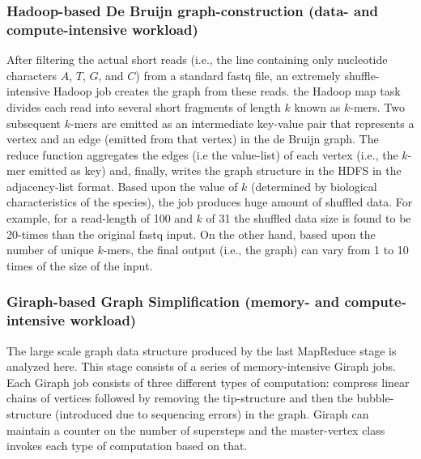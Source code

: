 \documentclass[conference]{IEEEtran}
\begin{document}
\subsubsection {Hadoop-based De Bruijn graph-construction (data- and compute-intensive workload)}
After filtering the actual short reads (i.e., the line containing only nucleotide characters $A$, $T$, $G$, and $C$) from a standard fastq file, an extremely shuffle-intensive Hadoop job creates the graph from these reads.  the Hadoop map task divides each read into several short fragments of length $k$ known as $k$-mers. Two subsequent $k$-mers are emitted as an intermediate key-value pair that represents  a vertex and an edge (emitted from that vertex) in the de Bruijn graph.  The reduce function aggregates the edges (i.e the value-list) of each vertex (i.e., the $k$-mer emitted as key) and, finally, writes the graph structure in the HDFS in the adjacency-list format. Based upon the value of $k$ (determined by biological characteristics of the species), the job produces huge amount of shuffled data. For example, for a read-length of 100 and $k$ of 31 the shuffled data size is found to be 20-times than the original fastq input. On the other hand, based upon the number of unique $k$-mers, the final output (i.e., the graph) can vary from 1 to 10 times of the size of the input. 

\subsubsection {Giraph-based Graph Simplification (memory- and compute-intensive workload)}
The large scale graph data structure produced by the last MapReduce stage is analyzed here. This stage consists of a series of memory-intensive Giraph jobs. Each Giraph job consists of three different types of computation: compress linear chains of vertices followed by removing the tip-structure and then the bubble-structure (introduced due to sequencing errors) in the graph. Giraph can maintain a counter on the number of supersteps and the master-vertex class invokes each type of computation based on that.  
\end{document}
